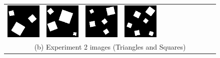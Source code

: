 \documentclass[letterpaper]{article} %
\begin{document}
\begin{figure}[!htbp]
\begin{tabular}{cccccccccccc}
\multicolumn{1}{c}{\includegraphics[width=0.125\columnwidth]{images/square_3.png}} \hspace{-12pt} &
\multicolumn{1}{c}{\includegraphics[width=0.125\columnwidth]{images/square_4.png}} \hspace{-12pt} &
\multicolumn{1}{c}{\includegraphics[width=0.125\columnwidth]{images/square_5.png}} \hspace{-12pt} &
\multicolumn{1}{c}{\includegraphics[width=0.125\columnwidth]{images/square_6.png}} \\
\multicolumn{12}{c}{(b) Experiment 2 images (Triangles and Squares)} \\


\end{tabular}
\end{figure}
\end{document}
